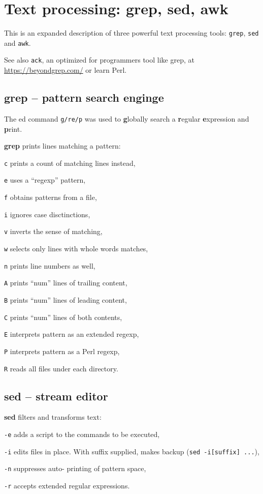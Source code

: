 \section{Text processing: grep, sed, awk}
This is an expanded description of three powerful text processing tools:
\texttt{grep}, \texttt{sed} and \texttt{awk}.

See also \texttt{ack}, an optimized for programmers tool like grep, at \url{https://beyondgrep.com/} or learn Perl.

\subsection{grep -- pattern search enginge}
The ed command \texttt{g/re/p} was used to \textbf{g}lobally search a \textbf{r}egular \textbf{e}xpression and \textbf{p}rint.
\begin{compactenum}
\item [\cmdvar] \textbf{grep} prints lines matching a pattern:
\item [\texttt{c}] prints a count of matching lines instead,
\item [\texttt{e}] uses a ``regexp'' pattern,
\item [\texttt{f}] obtains patterns from a file,
\item [\texttt{i}] ignores case disctinctions,
\item [\texttt{v}] inverts the sense of matching,
\item [\texttt{w}] selects only lines with whole words matches,
\item [\texttt{n}] prints line numbers as well,
\item [\texttt{A}] prints ``num'' lines of trailing content,
\item [\texttt{B}] prints ``num'' lines of leading content,
\item [\texttt{C}] prints ``num'' lines of both contents,
\item [\texttt{E}] interprets pattern as an extended regexp,
\item [\texttt{P}] interprets pattern as a Perl regexp,
\item [\texttt{R}] reads all files under each directory.
\end{compactenum}

\subsection{sed -- stream editor}
\begin{compactenum}
	\item [\cmdcore] \textbf{sed} filters and transforms text:
	\item [\texttt{-e}] adds a script to the commands to be executed,
	\item [\texttt{-i}] edits files in place. With suffix supplied, makes backup (\texttt{sed -i[suffix] ...}), 
	\item [\texttt{-n}] suppresses auto- printing of pattern space,
  \item [\texttt{-r}] accepts extended regular expressions.
\end{compactenum}

